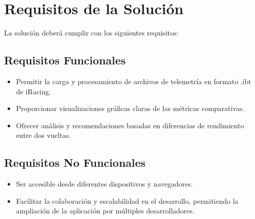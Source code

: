 \section{Requisitos de la Solución}
La solución deberá cumplir con los siguientes requisitos:

\subsection{Requisitos Funcionales}
\begin{itemize}
    \item Permitir la carga y procesamiento de archivos de telemetría en formato .ibt de iRacing.
    \item Proporcionar visualizaciones gráficas claras de las métricas comparativas.
    \item Ofrecer análisis y recomendaciones basadas en diferencias de rendimiento entre dos vueltas.
\end{itemize}

\subsection{Requisitos No Funcionales}
\begin{itemize}
    \item Ser accesible desde diferentes dispositivos y navegadores.
    \item Facilitar la colaboración y escalabilidad en el desarrollo, permitiendo la ampliación de la aplicación por múltiples desarrolladores.
\end{itemize}